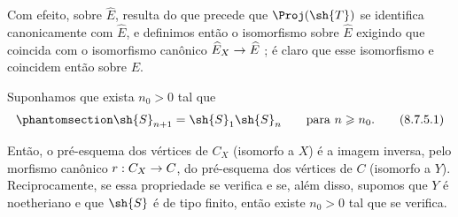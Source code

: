 \documentclass[oneside,10pt]{amsart}
\makeatletter
\renewcommand{\geq}{\geqslant}
\newcommand{\ega@arrow}[2]{\mathchoice{#1}{#2}{#2}{#2}}
\renewcommand{\to}{\ega@arrow{\longrightarrow}{\rightarrow}}
\let\EGAOriginalLabel\label
\renewcommand{\label}[1]{\phantomsection\EGAOriginalLabel{#1}}
\makeatother
\begin{document}
\begin{remark}[8.7.4]
\begin{enumerate}
    Com efeito, sobre $\widehat{E}$, resulta do que precede que $\Proj(\sh{T})$ se identifica canonicamente com $\widehat{E}$, e definimos então o isomorfismo  sobre $\widehat{E}$ exigindo que coincida com o isomorfismo canônico $\widehat{E}_X\to\widehat{E}$ ;
    é claro que esse isomorfismo e  coincidem então sobre $E$.
\end{enumerate}
\end{remark}
\begin{corollary}[8.7.5]
\label{II.8.7.5}
Suponhamos que exista $n_0>0$ tal que
\[
\label{II.8.7.5.1}
  \sh{S}_{n+1} = \sh{S}_1\sh{S}_n
  \qquad
  \text{para }n\geq n_0.
\tag{8.7.5.1}
\]

Então, o pré-esquema dos vértices de $C_X$ (isomorfo a $X$) é a imagem inversa, pelo morfismo canônico $r:C_X\to C$, do pré-esquema dos vértices de $C$ (isomorfo a $Y$).
Reciprocamente, se essa propriedade se verifica e se, além disso, supomos que $Y$ é noetheriano e que $\sh{S}$ é de tipo finito, então existe $n_0>0$ tal que  se verifica.
\end{corollary}
\end{document}
